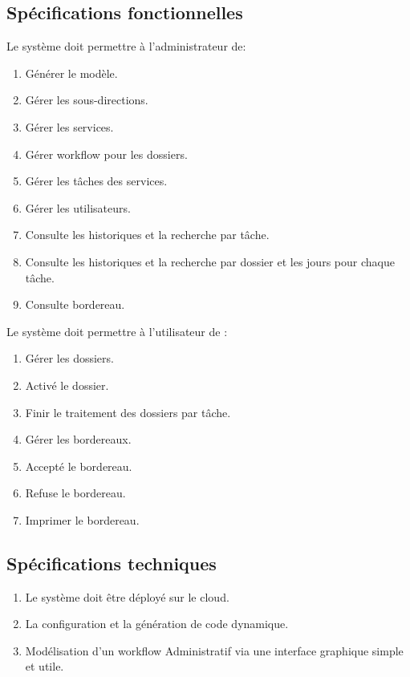  \subsection{Spécifications fonctionnelles }
  Le système doit permettre à l’administrateur  de:
 \begin{enumerate}
\item  	    Générer le modèle. 
\item  	    Gérer les sous-directions. 
\item  	    Gérer les services.
\item  	    Gérer workflow pour les dossiers.  
\item  	    Gérer les tâches des services.  
\item  	    Gérer les utilisateurs. 
\item  	    Consulte les historiques  et la recherche par tâche. 
\item  	    Consulte les historiques  et la recherche par dossier et les jours pour chaque tâche. 
\item  	    Consulte bordereau. 
 \end{enumerate}
 Le système doit permettre à l’utilisateur   de :
 \begin{enumerate}
\item  	    Gérer les dossiers. 
\item  	    Activé le dossier.    
\item  	    Finir le traitement des dossiers par tâche.    
\item  	    Gérer les  bordereaux.  
\item  	    Accepté le  bordereau.  
\item  	    Refuse  le  bordereau.  
\item  	    Imprimer le  bordereau.  

 \end{enumerate}
 
 
 
 
  \subsection{Spécifications techniques }
 
 
 
  \begin{enumerate}
 	\item  	   Le système doit être déployé sur le cloud.  
 	\item  	   La configuration et la génération  de code dynamique.  
 	\item  	  Modélisation d'un workflow Administratif via une interface graphique simple et utile. 
 
 	
 \end{enumerate}
 
